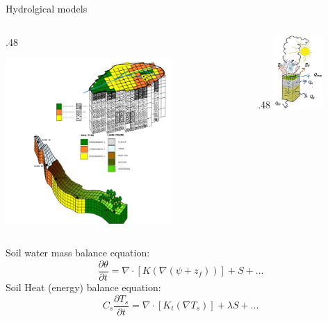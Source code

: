 \documentclass[ignorenonframetext,]{beamer}
\def\begincols{\begin{columns}}
\def\begincol{\begin{column}}
\def\endcol{\end{column}}
\def\endcols{\end{columns}}
\begin{document}
\begin{frame}{Hydrolgical models}

\begincols
 \begincol{.48\textwidth}

\includegraphics[width=0.70000\textwidth]{resources/images/geotop_grid.jpg}~

\endcol
\begincol{.48\textwidth}
\includegraphics[width=0.50000\textwidth]{resources/images/water_balance.png}\\
\endcol
\endcols
Soil water mass balance equation:
\[\frac{\partial \theta}{\partial t} =   \nabla  \cdot \left[ K \left(\nabla (\psi+z_f) \right) \right] + S + ...\]
Soil Heat (energy) balance equation:
\[C_s \frac{\partial T_s}{\partial t} =  \nabla  \cdot \left[ K_t  ( \nabla T_s  ) \right] + \lambda S + ...\]

\end{frame}
\end{document}
